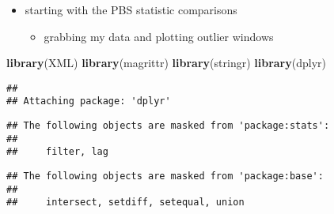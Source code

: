 \documentclass[]{article}
\newenvironment{Shaded}{\begin{snugshade}}{\end{snugshade}}
\newcommand{\KeywordTok}[1]{\textcolor[rgb]{0.13,0.29,0.53}{\textbf{#1}}}
\newcommand{\NormalTok}[1]{#1}
\providecommand{\tightlist}{%
  \setlength{\itemsep}{0pt}\setlength{\parskip}{0pt}}
\begin{document}
\begin{itemize}
\tightlist
\item
  starting with the PBS statistic comparisons

  \begin{itemize}
  \tightlist
  \item
    grabbing my data and plotting outlier windows
  \end{itemize}
\end{itemize}

\begin{Shaded}
\begin{Highlighting}[]
\KeywordTok{library}\NormalTok{(XML)}
\KeywordTok{library}\NormalTok{(magrittr)}
\KeywordTok{library}\NormalTok{(stringr)}
\KeywordTok{library}\NormalTok{(dplyr)}
\end{Highlighting}
\end{Shaded}

\begin{verbatim}
## 
## Attaching package: 'dplyr'
\end{verbatim}

\begin{verbatim}
## The following objects are masked from 'package:stats':
## 
##     filter, lag
\end{verbatim}

\begin{verbatim}
## The following objects are masked from 'package:base':
## 
##     intersect, setdiff, setequal, union
\end{verbatim}
\end{document}
